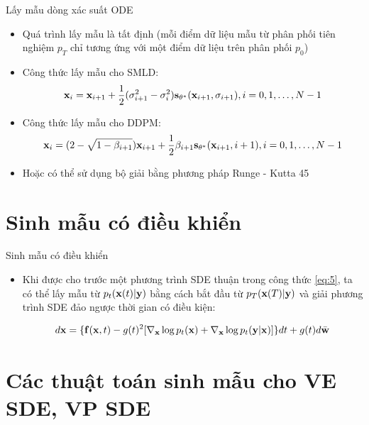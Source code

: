 \documentclass[10pt]{beamer}
\theoremstyle{remark}
\numberwithin{algocf}{section}
\numberwithin{equation}{section}
\numberwithin{dl}{section}
\numberwithin{figure}{section}
\begin{document}
\begin{frame}{Lấy mẫu dòng xác suất ODE}
	\begin{itemize}
		\item Quá trình lấy mẫu là tất định (mỗi điểm dữ liệu mẫu từ phân phối tiên nghiệm $p_T$ chỉ tương ứng với một điểm dữ liệu trên phân phối $p_0$)
		\item Công thức lấy mẫu cho SMLD:
		\begin{equation} \label{eq:43}
			\bold{x}_i = \bold{x}_{i+1} + \dfrac{1}{2} (\sigma_{i+1}^2 - \sigma_i^2) \bold{s}_{\bold{\theta}^{\ast}} (\bold{x}_{i+1}, \sigma_{i+1}), i = 0, 1, \dots, N - 1
		\end{equation}
		\item Công thức lấy mẫu cho DDPM:
		\begin{equation} \label{eq:44}
			\bold{x}_i = (2 - \sqrt{1 - \beta_{i+1}}) \bold{x}_{i+1} + \dfrac{1}{2} \beta_{i+1} \bold{s}_{\bold{\theta}^{\ast}} (\bold{x}_{i+1}, i + 1), i = 0, 1, \dots, N - 1
		\end{equation}
		\item Hoặc có thể sử dụng bộ giải bằng phương pháp Runge - Kutta 45
	\end{itemize}
\end{frame}

\section{Sinh mẫu có điều khiển}

\begin{frame}{Sinh mẫu có điều khiển}
	\begin{itemize}
		\item Khi được cho trước một phương trình SDE thuận trong công thức \ref{eq:5}, ta có thể lấy mẫu từ $p_t(\bold{x}(t) \vert \bold{y})$ bằng cách bắt đầu từ $p_T (\bold{x}(T) \vert \bold{y})$ và giải phương trình SDE đảo ngược thời gian có điều kiện:

		\begin{equation} \label{eq:14}
			d \bold{x} = \lbrace \bold{f}(\bold{x}, t) - g (t)^2 \lbrack \nabla_{\bold{x}} \log p_t(\bold{x}) + \nabla_{\bold{x}} \log p_t (\bold{y} \vert \bold{x}) \rbrack \rbrace dt + g(t) d \bar{\bold{w}}
		\end{equation}
	\end{itemize}
\end{frame}

\section{Các thuật toán sinh mẫu cho VE SDE, VP SDE}
\end{document}
